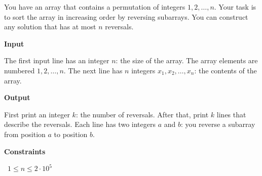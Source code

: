 You have an array that contains a permutation of integers $1,2,\dots,n$. Your task is to sort the array in increasing order by reversing subarrays. You can construct any solution that has at most $n$ reversals.

\vspace{0.3cm}\noindent\textbf{Input}

The first input line has an integer $n$: the size of the array. The array elements are numbered $1,2,\dots,n$.
The next line has $n$ integers $x_1,x_2,\dots,x_n$: the contents of the array.

\vspace{0.3cm}\noindent\textbf{Output}

First print an integer $k$: the number of reversals.
After that, print $k$ lines that describe the reversals. Each line has two integers $a$ and $b$: you reverse a subarray from position $a$ to position $b$.

\vspace{0.3cm}\noindent\textbf{Constraints}

\textbullet\ $1 \le n \le 2 \cdot 10^5$